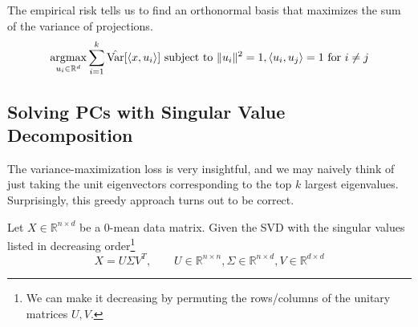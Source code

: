   \begin{theorem}
    The empirical risk tells us to find an orthonormal basis that maximizes the sum of the variance of projections. 
    \begin{equation}
      \operatorname*{\arg\!\max}_{u_i \in \mathbb{R}^d} \sum_{i=1}^k \hat{\operatorname{Var}}[ \langle x, u_i \rangle ] \text{ subject to } \|u_i\|^2 = 1, \langle u_i, u_j \rangle = 1 \text{ for } i \neq j
    \end{equation}
  \end{theorem}

\subsection{Solving PCs with Singular Value Decomposition}

  The variance-maximization loss is very insightful, and we may naively think of just taking the unit eigenvectors corresponding to the top $k$ largest eigenvalues. Surprisingly, this greedy approach turns out to be correct. 

  \begin{theorem}
    
  \end{theorem}

  \begin{theorem} 
    Let $X \in \mathbb{R}^{n \times d}$ be a $0$-mean data matrix. Given the SVD with the singular values listed in decreasing order\footnote{We can make it decreasing by permuting the rows/columns of the unitary matrices $U, V$.}
    \begin{equation}
      X = U \Sigma V^T, \qquad U \in \mathbb{R}^{n \times n}, \Sigma \in \mathbb{R}^{n \times d}, V \in \mathbb{R}^{d \times d}
    \end{equation}
  \end{theorem}

